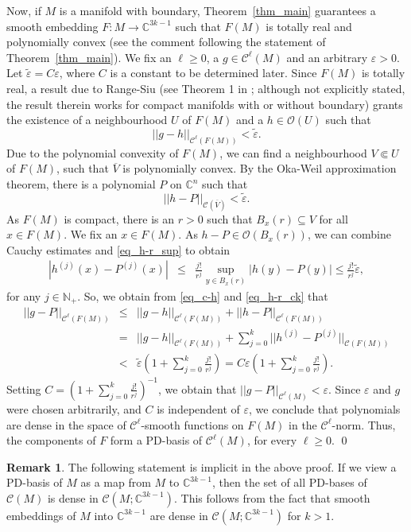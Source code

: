 \documentclass[10pt]{amsart}
\numberwithin{equation}{section}
\theoremstyle{definition}
\theoremstyle{definition}
\newtheorem*{rmk}{Remark}
\theoremstyle{plain}
\newcommand{\beas}{\begin{eqnarray*}}
\newcommand{\eeas}{\end{eqnarray*}}
\newcommand{\be} {\begin{equation}}
\newcommand{\ee} {\end{equation}}
\newcommand{\bea} {\begin{eqnarray}}
\newcommand{\eea} {\end{eqnarray}}
\newcommand{\eps}{\varepsilon}
\newcommand{\cont}{\mathcal{C}}
\newcommand{\hol}{\mathcal{O}}
\newcommand{\wt}{\widetilde}
\newcommand{\Cn}{\mathbb{C}^n}
\newcommand{\C} {\mathbb{C}}
\newcommand{\pnat} {\mathbb{N}_+}
\begin{document}
Now, if $M$ is a manifold with boundary, Theorem~\ref{thm_main} guarantees a smooth embedding $F:M\rightarrow\C^{3k-1}$ such that $F(M)$ is totally real and polynomially convex (see the comment following the statement of Theorem~\ref{thm_main}). We fix an $\ell\geq 0$, a $g\in\cont^\ell(M)$ and an arbitrary $\eps>0$. Let $\wt\eps=C\eps$, where $C$ is a constant to be determined later. Since $F(M)$ is totally real, a result due to Range-Siu (see Theorem 1 in \cite{RaSi74}; although not explicitly stated, the result therein works for compact manifolds with or without boundary) grants the existence of a neighbourhood $U$ of $F(M)$ and a $h\in\hol(U)$ such that
	\be\label{eq_c-h}
		||g-h||_{\cont^\ell(F(M))}<\wt\eps.
	\ee
Due to the polynomial convexity of $F(M)$, we can find a neighbourhood $V\Subset U$ of $F(M)$, such that $\overline V$ is polynomially convex. By the Oka-Weil approximation theorem, there is a polynomial $P$ on $\Cn$ such that  
	\be\label{eq_h-r_sup}
		||h-P||_{\cont(\overline V)}< \wt\eps.
	\ee
As $F(M)$ is compact, there is an $r>0$ such that $B_x(r)\subseteq V$ for all $x\in F(M)$. We fix an $x\in F(M)$. As $h-P\in\hol(B_x(r))$, we can combine Cauchy estimates and \eqref{eq_h-r_sup} to obtain
	\bea 
		\left|h^{(j)}(x)-P^{(j)}(x)\right|
			&\leq&\frac{j!}{r^j}\sup_{y\in B_x(r)}|h(y)-P(y)| 
			\leq \frac{j!}{r^j}\wt\eps,		\label{eq_h-r_ck}								
	\eea
for any $j\in\pnat$. So, we obtain from \eqref{eq_c-h} and \eqref{eq_h-r_ck} that
	\beas
		||g-P||_{\cont^\ell(F(M))}&\leq &||g-h||_{\cont^\ell(F(M))}+||h-P||_{\cont^\ell(F(M))}\\
		&=&||g-h||_{\cont^\ell(F(M))}+\sum_{j=0}^k ||h^{(j)}-P^{(j)}||_{\cont(F(M))}\\
		&<&\wt \eps\left(1+\sum_{j=0}^k \frac{j!}{r^j}\right)
		=C\eps\left(1+\sum_{j=0}^k \frac{j!}{r^j}\right).
	\eeas
Setting $C=\left(1+\sum_{j=0}^k \frac{j!}{r^j}\right)^{-1}$, we obtain that $	||g-P||_{\cont^\ell(M)}<\eps$. Since $\eps$ and $g$ were chosen arbitrarily, and $C$ is independent of $\eps$, we conclude that polynomials are dense in the space of $\cont^\ell$-smooth functions on $F(M)$ in the $\cont^\ell$-norm. Thus, the components of $F$ form a PD-basis of $\cont^\ell(M)$, for every $\ell\geq 0$.
 \qed

\begin{rmk} The following statement is implicit in the above proof. If we view a PD-basis of $M$ as a map from $M$ to $\C^{3k-1}$, then the set of all PD-bases of $\cont(M)$ is dense in $\cont(M;\C^{3k-1})$. This follows from the fact that smooth embeddings of $M$ into $\C^{3k-1}$ are dense in $\cont(M;\C^{3k-1})$ for $k>1$. 
\end{rmk}
\end{document}
